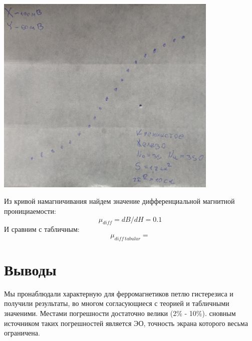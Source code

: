 \documentclass[12pt]{article}
\begin{document}
\begin{minipage}{0.5\textwidth}
\begin{center}
    \includegraphics[width=0.8\textwidth]{iron.jpg}
    \label{fer}
\end{center}
\end{minipage}
\begin{minipage}{0.5\textwidth}
Из кривой намагничивания найдем значение дифференциальной магнитной пронициаемости:
    \begin{equation*}
        \mu_{diff} = dB/dH = 0.1
    \end{equation*}
И сравним с табличным:
    \begin{equation*}
        \mu_{diff\: tabular} =  
    \end{equation*}
\end{minipage}

\section{Выводы}

Мы пронаблюдали характерную для ферромагнетиков петлю гистерезиса и получили результаты, во многом согласующиеся с теорией и табличными значеними. Местами погрешности достаточно велики (2\% - 10\%). сновным источником таких погрешностей является ЭО, точность экрана которого весьма ограничена.
\end{document}
